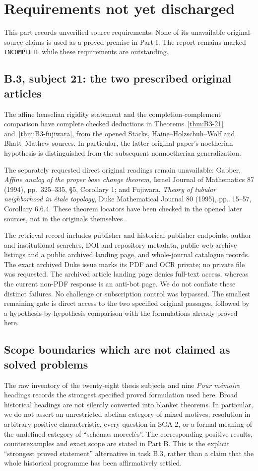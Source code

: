 \section{Requirements not yet discharged}
This part records unverified source requirements. None of its unavailable
original-source claims is used as a proved premise in Part I. The report
remains marked \texttt{INCOMPLETE} while these requirements are outstanding.

\subsection{B.3, subject 21: the two prescribed original articles}
The affine henselian rigidity statement and the completion-complement
comparison have complete checked deductions in
Theorems~\ref{thm:B3-21} and~\ref{thm:B3-fujiwara}, from the opened
Stacks, Haine--Holzschuh--Wolf and Bhatt--Mathew sources. In particular,
the latter original paper's noetherian hypothesis is distinguished
from the subsequent nonnoetherian generalization.

The separately requested direct original readings remain unavailable:
Gabber, \emph{Affine analog of the proper base change theorem},
Israel Journal of Mathematics 87 (1994), pp.~325--335,
\S5, Corollary 1; and Fujiwara, \emph{Theory of tubular neighborhood in
\'etale topology}, Duke Mathematical Journal 80 (1995), pp.~15--57,
Corollary 6.6.4. These theorem locators have been checked in the opened
later sources, not in the originals themselves
\cite{BGabber1994,BFujiwara1995}.

The retrieval record includes publisher and historical publisher
endpoints, author and institutional searches, DOI and repository
metadata, public web-archive listings and a public archived landing
page, and whole-journal catalogue records. The exact archived Duke
issue marks its PDF and OCR private; no private file was requested.
The archived article landing page denies full-text access, whereas
the current non-PDF response is an anti-bot page. We do not conflate
these distinct failures. No challenge or subscription control was
bypassed. The smallest remaining gate is direct access to the two
specified original passages, followed by a hypothesis-by-hypothesis
comparison with the formulations already proved here.

\subsection{Scope boundaries which are not claimed as solved problems}
The raw inventory of the twenty-eight thesis subjects and nine
\emph{Pour m\'emoire} headings records the strongest specified proved
formulation used here. Broad historical headings are not silently
converted into blanket theorems. In particular, we do not assert an
unrestricted abelian category of mixed motives, resolution in arbitrary
positive characteristic, every question in SGA 2, or a formal meaning
of the undefined category of ``sch\'emas morcel\'es''. The corresponding
positive results, counterexamples and exact scope are stated in Part B.
This is the explicit ``strongest proved statement'' alternative in
task B.3, rather than a claim that the whole historical programme has
been affirmatively settled.

